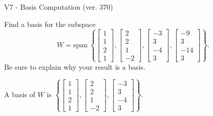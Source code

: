\begin{exercise}
  \begin{exerciseTitle}V7 - Basis Computation (ver. 370)\end{exerciseTitle}
  \begin{exerciseStatement}
    Find a basis for the subspace 
\[W=\mathrm{span}\ \left\{\left[\begin{array}{r}
1 \\
1 \\
2 \\
1
\end{array}\right] , \left[\begin{array}{r}
2 \\
2 \\
1 \\
-2
\end{array}\right] , \left[\begin{array}{r}
-3 \\
3 \\
-4 \\
3
\end{array}\right] , \left[\begin{array}{r}
-9 \\
3 \\
-14 \\
3
\end{array}\right]\right\}.\]
 Be sure to explain why your result is a basis.


  \end{exerciseStatement}
  \begin{exerciseAnswer}
   A basis of \(W\) is  \(\left\{\left[\begin{array}{r}
1 \\
1 \\
2 \\
1
\end{array}\right] , \left[\begin{array}{r}
2 \\
2 \\
1 \\
-2
\end{array}\right] , \left[\begin{array}{r}
-3 \\
3 \\
-4 \\
3
\end{array}\right]\right\}\).
  


  \end{exerciseAnswer}
\end{exercise}